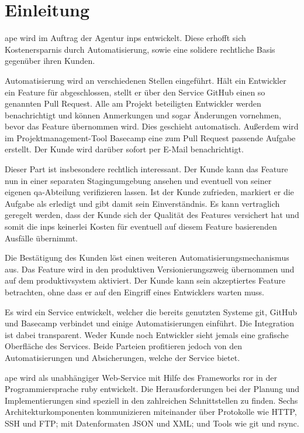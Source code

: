 \section{Einleitung} %
\label{sec:einleitung}

\gls{ape} wird im Auftrag der Agentur \gls{inps} entwickelt. Diese erhofft sich Kostenersparnis durch Automatisierung, sowie eine solidere rechtliche Basis gegenüber ihren Kunden.

Automatisierung wird an verschiedenen Stellen eingeführt. Hält ein Entwickler ein Feature für abgeschlossen, stellt er über den Service GitHub einen so genannten Pull Request. Alle am Projekt beteiligten Entwickler werden benachrichtigt und können Anmerkungen und sogar Änderungen vornehmen, bevor das Feature übernommen wird. Dies geschieht automatisch. Außerdem wird im Projektmanagement-Tool Basecamp eine zum Pull Request passende Aufgabe erstellt. Der Kunde wird darüber sofort per E-Mail benachrichtigt.

Dieser Part ist insbesondere rechtlich interessant. Der Kunde kann das Feature nun in einer separaten Stagingumgebung ansehen und eventuell von seiner eigenen \gls{qa}-Abteilung verifizieren lassen. Ist der Kunde zufrieden, markiert er die Aufgabe als erledigt und gibt damit sein Einverständnis. Es kann vertraglich geregelt werden, dass der Kunde sich der Qualität des Features versichert hat und somit die \gls{inps} keinerlei Kosten für eventuell auf diesem Feature basierenden Ausfälle übernimmt.

Die Bestätigung des Kunden löst einen weiteren Automatisierungsmechanismus aus. Das Feature wird in den produktiven Versionierungszweig übernommen und auf dem \gls{produktivsystem} aktiviert. Der Kunde kann sein akzeptiertes Feature betrachten, ohne dass er auf den Eingriff eines Entwicklers warten muss.

Es wird ein Service entwickelt, welcher die bereits genutzten Systeme git, GitHub und Basecamp verbindet und einige Automatisierungen einführt. Die Integration ist dabei transparent. Weder Kunde noch Entwickler sieht jemals eine grafische Oberfläche des Services. Beide Parteien profitieren jedoch von den Automatisierungen und Absicherungen, welche der Service bietet.

\gls{ape} wird als unabhängiger Web-Service mit Hilfe des Frameworks \gls{ror} in der Programmiersprache \gls{ruby} entwickelt. Die Herausforderungen bei der Planung und Implementierungen sind speziell in den zahlreichen Schnittstellen zu finden. Sechs Architekturkomponenten kommunizieren miteinander über Protokolle wie HTTP, SSH und FTP; mit Datenformaten JSON und XML; und Tools wie git und rsync.

